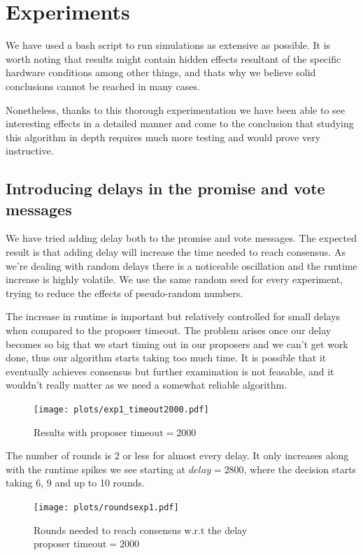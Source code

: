 \documentclass[a4paper, 10pt]{article}
\begin{document}
\clearpage
\section{Experiments}

We have used a bash script to run simulations as extensive as possible. It is worth noting that results might contain hidden effects resultant of the specific hardware conditions among other things, and thats why we believe solid conclusions cannot be reached in many cases.

Nonetheless, thanks to this thorough experimentation we have been able to see interesting effects in a detailed manner and come to the conclusion that studying this algorithm in depth requires much more testing and would prove very instructive.

\subsection{Introducing delays in the promise and vote messages}
\label{sec:delays}

We have tried adding delay both to the promise and vote messages. The expected result is 
that adding delay will increase the time needed to reach consensus. As we're dealing with
random delays there is a noticeable oscillation and the runtime increase is highly volatile.
We use the same random seed for every experiment, trying to reduce the effects of pseudo-random numbers.


The increase in runtime is important but relatively controlled for small delays when compared
to the proposer timeout. The problem arises once our delay becomes so big that we start 
timing out in our proposers and we can't get work done, thus our algorithm starts taking too
much time. It is possible that it eventually achieves consensus but further examination 
is not feasable, and it wouldn't really matter as we need a somewhat reliable algorithm. 


\begin{figure}[H]
  \centering
  \texttt{[image: plots/exp1\_timeout2000.pdf]}
    \caption{Results with $\text{proposer timeout}=2000$}
\end{figure}

The number of rounds is 2 or less for almost every delay. It only increases along with the runtime spikes we see starting at $delay=2800$, where the decision starts taking 6, 9 and up to 10 rounds.
\begin{figure}[H]
  \centering
  \texttt{[image: plots/roundsexp1.pdf]}
    \caption{Rounds needed to reach consensus w.r.t the delay\protect\footnotemark \   $\text{proposer timeout}=2000$}
\end{figure} 
\end{document}

